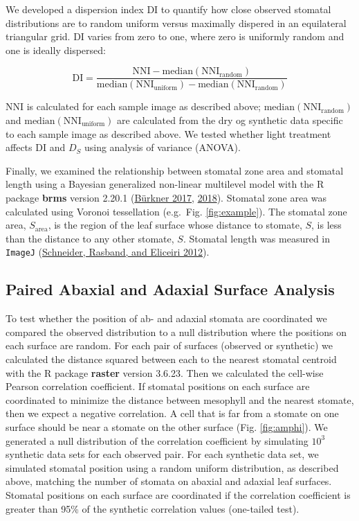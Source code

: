 \documentclass[12pt,halfline,a4paper,]{ouparticle}
\begin{document}
We developed a dispersion index \(\mathrm{DI}\) to quantify how close
observed stomatal distributions are to random uniform versus maximally
dispered in an equilateral triangular grid. \(\mathrm{DI}\) varies from
zero to one, where zero is uniformly random and one is ideally
dispersed:

\begin{equation}\label{eq:disp}
  \mathrm{DI} = \frac{\mathrm{NNI} - \text{median}(\mathrm{NNI_{random}})}{\text{median}(\mathrm{NNI_{uniform}}) - \text{median}(\mathrm{NNI_{random}})}
\end{equation}

\noindent \(\mathrm{NNI}\) is calculated for each sample image as
described above; \(\text{median}(\mathrm{NNI_{random}})\) and
\(\text{median}(\mathrm{NNI_{uniform}})\) are calculated from the dry og
synthetic data specific to each sample image as described above. We
tested whether light treatment affects \(\mathrm{DI}\) and \(D_S\) using
analysis of variance (ANOVA).

Finally, we examined the relationship between stomatal zone area and
stomatal length using a Bayesian generalized non-linear multilevel model
with the R package \textbf{brms} version 2.20.1
(\protect\hyperlink{ref-burkner_brms_2017}{Bürkner 2017},
\protect\hyperlink{ref-burkner_advanced_2018}{2018}). Stomatal zone area
was calculated using Voronoi tessellation (e.g.~Fig. \ref{fig:example}).
The stomatal zone area, \(S_\text{area}\), is the region of the leaf
surface whose distance to stomate, \(S\), is less than the distance to
any other stomate, \(S\). Stomatal length was measured in
\texttt{ImageJ} (\protect\hyperlink{ref-schneider_nih_2012}{Schneider,
Rasband, and Eliceiri 2012}).

\hypertarget{paired-abaxial-and-adaxial-surface-analysis}{%
\subsection{Paired Abaxial and Adaxial Surface
Analysis}\label{paired-abaxial-and-adaxial-surface-analysis}}

To test whether the position of ab- and adaxial stomata are coordinated
we compared the observed distribution to a null distribution where the
positions on each surface are random. For each pair of surfaces
(observed or synthetic) we calculated the distance squared between each
to the nearest stomatal centroid with the R package \textbf{raster}
version 3.6.23. Then we calculated the cell-wise Pearson correlation
coefficient. If stomatal positions on each surface are coordinated to
minimize the distance between mesophyll and the nearest stomate, then we
expect a negative correlation. A cell that is far from a stomate on one
surface should be near a stomate on the other surface (Fig.
\ref{fig:amphi}). We generated a null distribution of the correlation
coefficient by simulating \(10^3\) synthetic data sets for each observed
pair. For each synthetic data set, we simulated stomatal position using
a random uniform distribution, as described above, matching the number
of stomata on abaxial and adaxial leaf surfaces. Stomatal positions on
each surface are coordinated if the correlation coefficient is greater
than 95\% of the synthetic correlation values (one-tailed test).
\end{document}
